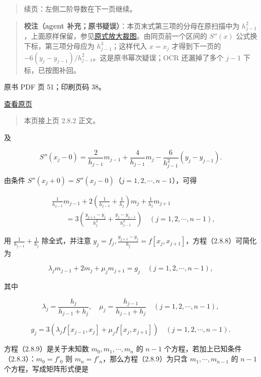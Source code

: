 \begin{quote}
续页：左侧二阶导数在下一页继续。
\end{quote}

\begin{quote}
\textbf{校注（agent 补充；原书疑误）}：本页末式第三项的分母在原扫描中为 \(h_{j-1}^2\)，上面原样保留，参见\href{verified/assets/ch02b/pdf-050-second-derivative-detail.png}{原式放大裁图}。由同页前一个区间的 \(S''(x)\) 公式换下标，第三项分母应为 \(h_{j-1}^3\)；这样代入 \(x=x_j\) 才得到下一页的 \(-6(y_j-y_{j-1})/h_{j-1}^2\)。这是原书幂次疑误；OCR 还漏掉了多个 \(j-1\) 下标，已按图补回。
\end{quote}

\clearpage

原书 PDF 页 51；印刷页码 38。

\href{source-images/pdf-051.jpeg}{查看原页}

\begin{quote}
本页接上页 2.8.2 正文。
\end{quote}

及

\[S''(x_j-0)=\frac2{h_{j-1}}m_{j-1}+\frac4{h_{j-1}}m_j-\frac6{h_{j-1}^2}(y_j-y_{j-1}).\]

由条件 \(S''(x_j+0)=S''(x_j-0)\)（\(j=1,2,\cdots,n-1\)），可得

\[\begin{aligned}
&\frac1{h_{j-1}}m_{j-1}+2\left(\frac1{h_{j-1}}+\frac1{h_j}\right)m_j+\frac1{h_j}m_{j+1}\\
&\qquad=3\left(\frac{y_{j+1}-y_j}{h_j^2}+\frac{y_j-y_{j-1}}{h_{j-1}^2}\right)\quad(j=1,2,\cdots,n-1),
\end{aligned}\tag{2.8.8}\]

用 \(\frac1{h_{j-1}}+\frac1{h_j}\) 除全式，并注意 \(y_j=f_j,\frac{y_{j+1}-y_j}{h_j}=f[x_j,x_{j+1}]\)，方程（2.8.8）可简化为

\[\lambda_jm_{j-1}+2m_j+\mu_jm_{j+1}=g_j\quad(j=1,2,\cdots,n-1),\tag{2.8.9}\]

其中

\[\lambda_j=\frac{h_j}{h_{j-1}+h_j},\quad\mu_j=\frac{h_{j-1}}{h_{j-1}+h_j}\quad(j=1,2,\cdots,n-1),\tag{2.8.10}\]

\[g_j=3(\lambda_jf[x_{j-1},x_j]+\mu_jf[x_j,x_{j+1}])\quad(j=1,2,\cdots,n-1).\tag{2.8.11}\]

方程（2.8.9）是关于未知数 \(m_0,m_1,\cdots,m_n\) 的 \(n-1\) 个方程，若加上已知条件（2.8.3）：\(m_0=f'_0\) 则 \(m_n=f'_n\)，那么方程（2.8.9）为只含 \(m_1,\cdots,m_{n-1}\) 的 \(n-1\) 个方程，写成矩阵形式便是

